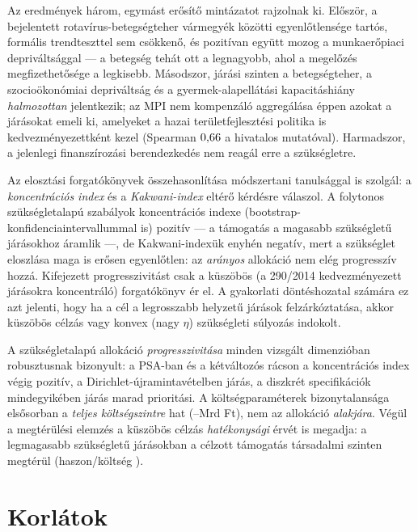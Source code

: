 \documentclass[12pt,a4paper]{article}
\begin{document}
Az eredmények három, egymást erősítő mintázatot rajzolnak ki. Először, a
bejelentett rotavírus-betegségteher vármegyék közötti egyenlőtlensége
tartós, formális trendteszttel sem csökkenő, és pozitívan együtt mozog a
munkaerőpiaci depriváltsággal --- a betegség tehát ott a legnagyobb, ahol a
megelőzés megfizethetősége a legkisebb. Másodszor, járási szinten a
betegségteher, a szocioökonómiai depriváltság és a gyermek-alapellátási
kapacitáshiány \emph{halmozottan} jelentkezik; az MPI nem kompenzáló
aggregálása éppen azokat a járásokat emeli ki, amelyeket a hazai
területfejlesztési politika is kedvezményezettként kezel (Spearman
$0{,}66$ a hivatalos mutatóval). Harmadszor, a jelenlegi
finanszírozási berendezkedés nem reagál erre a szükségletre.

Az elosztási forgatókönyvek összehasonlítása módszertani tanulsággal is
szolgál: a \emph{koncentrációs index} és a \emph{Kakwani-index} eltérő
kérdésre válaszol. A folytonos szükségletalapú szabályok koncentrációs
indexe (bootstrap-konfidenciaintervallummal is) pozitív --- a támogatás a
magasabb szükségletű járásokhoz áramlik ---, de Kakwani-indexük enyhén
negatív, mert a szükséglet eloszlása maga is erősen egyenlőtlen: az
\emph{arányos} allokáció nem elég progresszív hozzá. Kifejezett
progresszivitást csak a küszöbös (a 290/2014 kedvezményezett járásokra
koncentráló) forgatókönyv ér el. A gyakorlati döntéshozatal számára ez azt
jelenti, hogy ha a cél a legrosszabb helyzetű járások felzárkóztatása, akkor
küszöbös célzás vagy konvex (nagy $\eta$) szükségleti súlyozás indokolt.

A szükségletalapú allokáció \emph{progresszivitása} minden vizsgált
dimenzióban robusztusnak bizonyult: a PSA-ban és a kétváltozós rácson a
koncentrációs index végig pozitív, a Dirichlet-újramintavételben
\nRobustPriority{} járás, a diszkrét specifikációk mindegyikében
\nSpecRobust{} járás marad prioritási. A költségparaméterek bizonytalansága
elsősorban a \emph{teljes költségszintre} hat (\psaCostLo--\psaCostHi Mrd
Ft), nem az allokáció \emph{alakjára}. Végül a megtérülési elemzés a
küszöbös célzás \emph{hatékonysági} érvét is megadja: a legmagasabb
szükségletű járásokban a célzott támogatás társadalmi szinten megtérül
(haszon/költség \ceBcrTopNeed).

\section{Korlátok}
\end{document}
